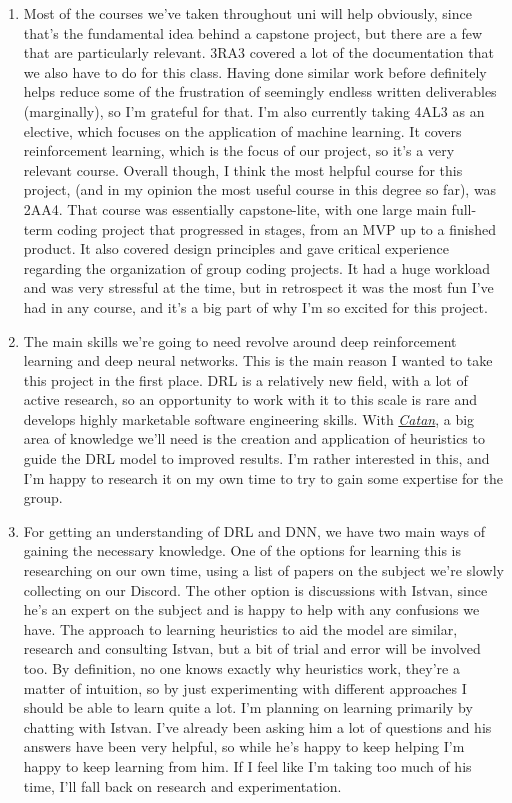 \documentclass{article}
\newcommand{\Catan}{\href{https://en.wikipedia.org/wiki/Catan}{Catan}}
\begin{document}
\begin{enumerate}
    \item Most of the courses we've taken throughout uni will help obviously, since that's the fundamental idea behind a capstone project, but there are a few that are particularly relevant.
    3RA3 covered a lot of the documentation that we also have to do for this class.
    Having done similar work before definitely helps reduce some of the frustration of seemingly endless written deliverables (marginally), so I'm grateful for that.
    I'm also currently taking 4AL3 as an elective, which focuses on the application of machine learning.
    It covers reinforcement learning, which is the focus of our project, so it's a very relevant course.
    Overall though, I think the most helpful course for this project, (and in my opinion the most useful course in this degree so far), was 2AA4.
    That course was essentially capstone-lite, with one large main full-term coding project that progressed in stages, from an MVP up to a finished product.
    It also covered design principles and gave critical experience regarding the organization of group coding projects.
    It had a huge workload and was very stressful at the time, but in retrospect it was the most fun I've had in any course, and it's a big part of why I'm so excited for this project.

    \item The main skills we're going to need revolve around deep reinforcement learning and deep neural networks.
    This is the main reason I wanted to take this project in the first place.
    DRL is a relatively new field, with a lot of active research, so an opportunity to work with it to this scale is rare and develops highly marketable software engineering skills.
    With \emph{\Catan{}}, a big area of knowledge we'll need is the creation and application of heuristics to guide the DRL model to improved results.
    I'm rather interested in this, and I'm happy to research it on my own time to try to gain some expertise for the group.

    \item For getting an understanding of DRL and DNN, we have two main ways of gaining the necessary knowledge.
    One of the options for learning this is researching on our own time, using a list of papers on the subject we're slowly collecting on our Discord.
    The other option is discussions with Istvan, since he's an expert on the subject and is happy to help with any confusions we have.
    The approach to learning heuristics to aid the model are similar, research and consulting Istvan, but a bit of trial and error will be involved too.
    By definition, no one knows exactly why heuristics work, they're a matter of intuition, so by just experimenting with different approaches I should be able to learn quite a lot.
    I'm planning on learning primarily by chatting with Istvan.
    I've already been asking him a lot of questions and his answers have been very helpful, so while he's happy to keep helping I'm happy to keep learning from him.
    If I feel like I'm taking too much of his time, I'll fall back on research and experimentation.

\end{enumerate}
\end{document}

